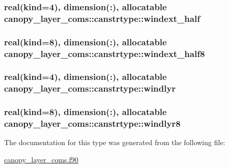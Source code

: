\subsubsection[{windext\+\_\+half}]{\setlength{\rightskip}{0pt plus 5cm}real(kind=4), dimension(\+:), allocatable canopy\+\_\+layer\+\_\+coms\+::canstrtype\+::windext\+\_\+half}\label{structcanopy__layer__coms_1_1canstrtype_a5922bffa2e8f10f4a9a793ce9839d1c0}
\hypertarget{structcanopy__layer__coms_1_1canstrtype_a42b218a7ffe018a0a4f6e753471ff11d}{}
\subsubsection[{windext\+\_\+half8}]{\setlength{\rightskip}{0pt plus 5cm}real(kind=8), dimension(\+:), allocatable canopy\+\_\+layer\+\_\+coms\+::canstrtype\+::windext\+\_\+half8}\label{structcanopy__layer__coms_1_1canstrtype_a42b218a7ffe018a0a4f6e753471ff11d}
\hypertarget{structcanopy__layer__coms_1_1canstrtype_a16bdb255323c8c033f924e1a658d7f4f}{}
\subsubsection[{windlyr}]{\setlength{\rightskip}{0pt plus 5cm}real(kind=4), dimension(\+:), allocatable canopy\+\_\+layer\+\_\+coms\+::canstrtype\+::windlyr}\label{structcanopy__layer__coms_1_1canstrtype_a16bdb255323c8c033f924e1a658d7f4f}
\hypertarget{structcanopy__layer__coms_1_1canstrtype_ad29af3fcb9a0ed4dc4985eb8f1714283}{}
\subsubsection[{windlyr8}]{\setlength{\rightskip}{0pt plus 5cm}real(kind=8), dimension(\+:), allocatable canopy\+\_\+layer\+\_\+coms\+::canstrtype\+::windlyr8}\label{structcanopy__layer__coms_1_1canstrtype_ad29af3fcb9a0ed4dc4985eb8f1714283}


The documentation for this type was generated from the following file\+:\begin{DoxyCompactItemize}
\item 
\hyperlink{canopy__layer__coms_8f90}{canopy\+\_\+layer\+\_\+coms.\+f90}\end{DoxyCompactItemize}
